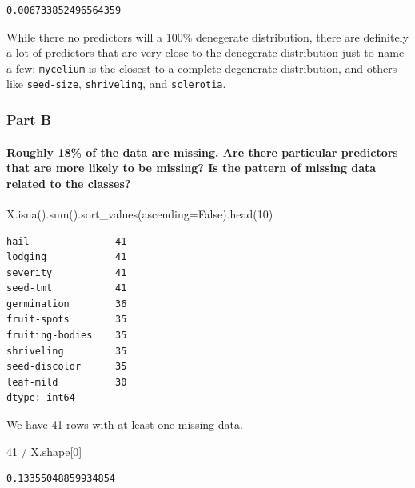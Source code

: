 \documentclass[
  11pt,
]{article}
\let\oldparagraph\paragraph
\renewcommand{\paragraph}[1]{\oldparagraph{#1}\mbox{}}
\newenvironment{Shaded}{\begin{snugshade}}{\end{snugshade}}
\newcommand{\BuiltInTok}[1]{\textcolor[rgb]{0.00,0.23,0.31}{#1}}
\newcommand{\DecValTok}[1]{\textcolor[rgb]{0.68,0.00,0.00}{#1}}
\newcommand{\NormalTok}[1]{\textcolor[rgb]{0.00,0.23,0.31}{#1}}
\newcommand{\OperatorTok}[1]{\textcolor[rgb]{0.37,0.37,0.37}{#1}}
\newcommand{\VariableTok}[1]{\textcolor[rgb]{0.07,0.07,0.07}{#1}}
\begin{document}
\begin{verbatim}
0.006733852496564359
\end{verbatim}

While there no predictors will a 100\% denegerate distribution, there
are definitely a lot of predictors that are very close to the denegerate
distribution just to name a few: \texttt{mycelium} is the closest to a
complete degenerate distribution, and others like \texttt{seed-size},
\texttt{shriveling}, and \texttt{sclerotia}.

\subsubsection{Part B}\label{part-b-1}

\paragraph{Roughly 18\% of the data are missing. Are there particular
predictors that are more likely to be missing? Is the pattern of missing
data related to the
classes?}\label{roughly-18-of-the-data-are-missing.-are-there-particular-predictors-that-are-more-likely-to-be-missing-is-the-pattern-of-missing-data-related-to-the-classes}

\begin{Shaded}
\begin{Highlighting}[]
\NormalTok{X.isna().}\BuiltInTok{sum}\NormalTok{().sort\_values(ascending}\OperatorTok{=}\VariableTok{False}\NormalTok{).head(}\DecValTok{10}\NormalTok{)}
\end{Highlighting}
\end{Shaded}

\begin{verbatim}
hail               41
lodging            41
severity           41
seed-tmt           41
germination        36
fruit-spots        35
fruiting-bodies    35
shriveling         35
seed-discolor      35
leaf-mild          30
dtype: int64
\end{verbatim}

We have 41 rows with at least one missing data.

\begin{Shaded}
\begin{Highlighting}[]
\DecValTok{41} \OperatorTok{/}\NormalTok{ X.shape[}\DecValTok{0}\NormalTok{]}
\end{Highlighting}
\end{Shaded}

\begin{verbatim}
0.13355048859934854
\end{verbatim}
\end{document}
